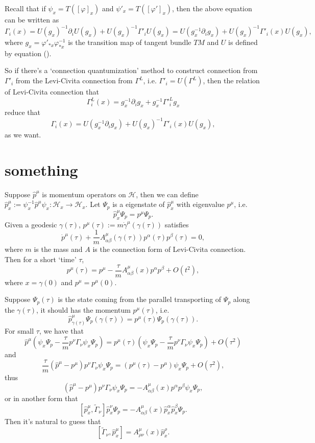 \documentclass[12pt]{article}
\theoremstyle{definition}
\theoremstyle{plain}
\begin{document}
Recall that if $\psi_x=T([\varphi]_x)$ and $\psi'_x=T([\varphi']_x)$, then the above equation can be written as
\[
	\Gamma_i(x)=U(g_x)^{-1}\partial_iU(g_x)+U(g_x)^{-1}\Gamma'_iU(g_x)=U(g_x^{-1}\partial_ig_x)+U(g_x)^{-1}\Gamma'_i(x)U(g_x),
\]
where $g_x=\varphi'_{*x}\varphi_{*x}^{-1}$ is the transition map of tangent bundle $TM$ and $U$ is defined by equation (\theequation).

So if there's a `connection quantumization' method to construct connection from $\Gamma'_i$ from the Levi-Civita connection from $\Gamma^L$, i.e. $\Gamma'_i=U(\Gamma^L)$, then the relation of Levi-Civita connection that
\[
	\Gamma^L_i(x)=g_x^{-1}\partial_ig_x+g_x^{-1}{\Gamma'}^L_ig_x
\]
reduce that
\[
	\Gamma_i(x)=U(g_x^{-1}\partial_ig_x)+U(g_x)^{-1}\Gamma'_i(x)U(g_x),
\]
as we want.

\section{something}

Suppose $\hat p^\mu$ is momentum operators on $\mathcal H$, then we can define $\hat p^\mu_x:=\psi_x^{-1}\hat p^\mu\psi_x:\mathcal H_x\to \mathcal H_x$. Let $\Psi_{p}$ is a eigenstate of $\hat p^\mu_x$ with eigenvalue $p^\mu$, i.e.
\[
	\hat p^\mu_x\Psi_{p}=p^\mu\Psi_{p}.
\]
Given a geodesic $\gamma(\tau)$, $p^\mu(\tau):=m\dot\gamma^\mu(\gamma(\tau))$ satisfies
\[
	\dot p^\mu(\tau)+\frac{1}{m}A^\mu_{\alpha\beta}(\gamma(\tau))p^\alpha(\tau)p^\beta(\tau)=0,
\]
where $m$ is the mass and $A$ is the connection form of Levi-Civita connection. Then for a short `time' $\tau$,
\[
	p^\mu(\tau)=p^\mu-\frac{\tau}{m}A^\mu_{\alpha\beta}(x)p^\alpha p^\beta +O(t^2),
\]
where $x=\gamma(0)$ and $p^\mu=p^\mu(0)$.

Suppose $\Psi_{p}(\tau)$ is the state coming from the parallel transporting of $\Psi_{p}$ along the $\gamma(\tau)$, it should has the momentum $p^\mu(\tau)$, i.e.
\[
	\hat p^\mu_{\gamma(\tau)}\Psi_p(\gamma(\tau))=p^\mu(\tau)\Psi_p(\gamma(\tau)).
\]
For small $\tau$, we have that
\[
	\hat p^\mu
	\left(
		\psi_{x}\Psi_p-\frac \tau m p^\nu\Gamma_{\nu}\psi_{x}\Psi_p
	\right)
	=p^\mu(\tau)
	\left(
		\psi_{x}\Psi_p-\frac \tau m p^\nu\Gamma_{\nu}\psi_{x}\Psi_p
	\right)
	+O(\tau^2)
\]
and
\[
	\frac \tau m (\hat p^\mu-p^\mu )p^\nu\Gamma_{\nu}\psi_{x}\Psi_p=(p^\mu(\tau)-p^\mu )\psi_{x}\Psi_p+O(\tau^2),
\]
thus
\[
	(\hat p^\mu-p^\mu )p^\nu\Gamma_{\nu}\psi_{x}\Psi_p=-A^\mu_{\alpha\beta}(x)p^\alpha p^\beta \psi_{x}\Psi_p,
\]
or in another form that
\[
	[\hat p^\mu_x,\widetilde{\Gamma}_{\nu}]\hat p^\nu_x\Psi_p=-A^\mu_{\alpha\beta}(x)\hat p_x^\alpha \hat p_x^\beta \Psi_p.
\]
Then it's natural to guess that
\[
	[\widetilde{\Gamma}_{\nu},\hat p^\mu_x]=A^\mu_{\rho\nu}(x)\hat p_x^\rho.
\]
\end{document}
